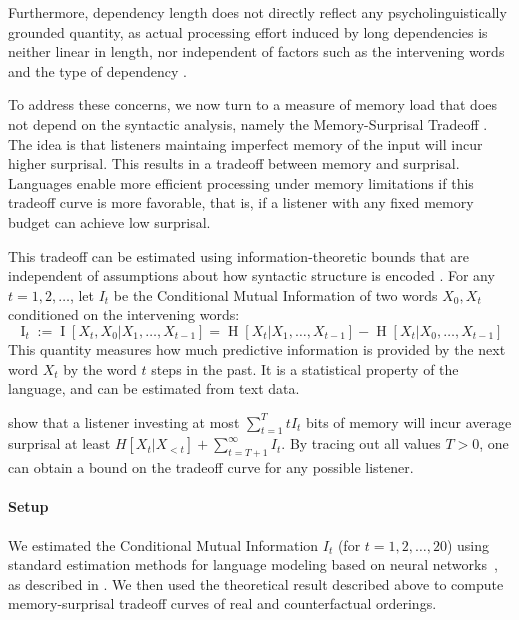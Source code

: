 \documentclass[11pt,a4paper]{article}
\begin{document}
Furthermore, dependency length does not directly reflect any psycholinguistically grounded quantity, as actual processing effort induced by long dependencies is neither linear in length, nor independent of factors such as the intervening words and the type of dependency \citep{gibson1998linguistic,lewis-activation-based-2005,demberg-data-2008}.

To address these concerns, we now turn to a measure of memory load that does not depend on the syntactic analysis, namely the Memory-Surprisal Tradeoff \citep{hahn2019memory}.
The idea is that listeners maintaing imperfect memory of the input will incur higher surprisal.
This results in a tradeoff between memory and surprisal.
Languages enable more efficient processing under memory limitations if this tradeoff curve is more favorable, that is, if a listener with any fixed memory budget can achieve low surprisal.

This tradeoff can be estimated using information-theoretic bounds that are independent of assumptions about how syntactic structure is encoded \citep{hahn2019memory}.
For any $t = 1, 2, \dots$, let $I_t$ be the Conditional Mutual Information of two words $X_0, X_t$ conditioned on the intervening words:
\begin{equation}
        \operatorname{I}_t := \operatorname{I}[X_t, X_0 | X_1, \dots, X_{t-1}] = \operatorname{H}[X_t|X_1, \dots, X_{t-1}] - \operatorname{H}[X_t|X_0, \dots, X_{t-1}] 
\end{equation}
This quantity  measures how much predictive information is provided by the next word $X_t$ by the word $t$ steps in the past.
It is a statistical property of the language, and can be estimated from text data.

\citet{hahn2019memory} show that a listener investing at most $\sum_{t=1}^T t I_t$ bits of memory will incur average surprisal at least $H[X_t| X_{<t}] + \sum_{t=T+1}^\infty I_t$.
By tracing out all values $T >0$, one can obtain a bound on the tradeoff curve for any possible listener.

\paragraph{Setup}
We estimated the Conditional Mutual Information $I_t$ (for $t=1,2,\dots,20$) using standard estimation methods for language modeling based on neural networks~\citep{hochreiter-long-1997}, as described in \citet{hahn2019memory}.
We then used the theoretical result described above to compute memory-surprisal tradeoff curves of real and counterfactual orderings.
\end{document}

